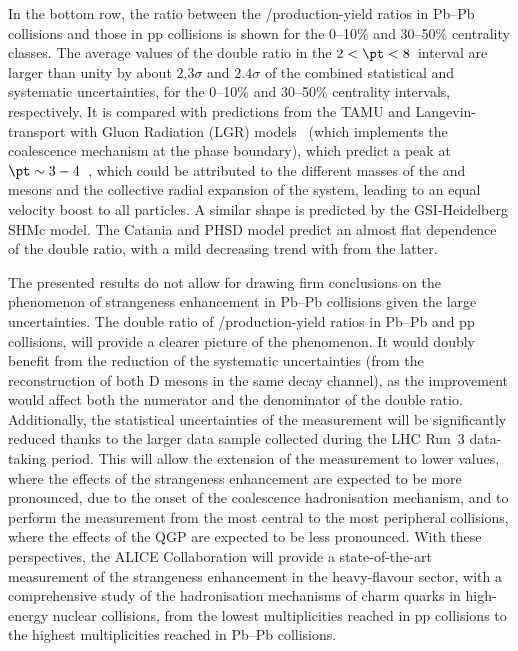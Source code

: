 In the bottom row, the ratio between the \ds/\dz production-yield ratios in Pb--Pb collisions and those in pp collisions is shown for the 0--10\% and 30--50\% centrality classes. The average values of the double ratio in the $2 < \pt < 8$~\gevc interval are larger than unity by about $2.3\sigma$ and $2.4\sigma$ of the combined statistical and systematic uncertainties, for the 0--10\% and 30--50\% centrality intervals, respectively. It is compared with predictions from the TAMU and Langevin-transport with Gluon Radiation (LGR) models~\cite{Li:2019lex} (which implements the coalescence mechanism at the phase boundary), which predict a peak at $\pt\sim3-4$~\gevc, which could be attributed to the different masses of the \ds and \dz mesons and the collective radial expansion of the system, leading to an equal velocity boost to all particles. A similar \pt shape is predicted by the GSI-Heidelberg SHMc model. The Catania and PHSD model predict an almost flat \pt dependence of the double ratio, with a mild decreasing trend with \pt from the latter. 


The presented results do not allow for drawing firm conclusions on the phenomenon of strangeness enhancement in Pb--Pb collisions given the large uncertainties. The double ratio of \ds/\dpl production-yield ratios in Pb--Pb and pp collisions, will provide a clearer picture of the phenomenon. It would doubly benefit from the reduction of the systematic uncertainties (from the reconstruction of both D mesons in the same decay channel), as the improvement would affect both the numerator and the denominator of the double ratio. Additionally, the statistical uncertainties of the measurement will be significantly reduced thanks to the larger data sample collected during the LHC Run~3 data-taking period. This will allow the extension of the measurement to lower \pt values, where the effects of the strangeness enhancement are expected to be more pronounced, due to the onset of the coalescence hadronisation mechanism, and to perform the measurement from the most central to the most peripheral collisions, where the effects of the QGP are expected to be less pronounced. With these perspectives, the ALICE Collaboration will provide a state-of-the-art measurement of the strangeness enhancement in the heavy-flavour sector, with a comprehensive study of the hadronisation mechanisms of charm quarks in high-energy nuclear collisions, from the lowest multiplicities reached in pp collisions to the highest multiplicities reached in Pb--Pb collisions.




